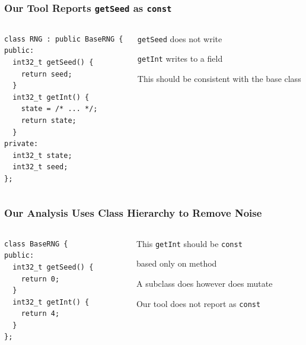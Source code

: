 \documentclass[aspectratio=169]{beamer}
\begin{document}
  \begin{frame}[fragile]
    \frametitle{Our Tool Reports \texttt{getSeed} as \texttt{const}}

    \begin{columns}
      \begin{column}{0.4\textwidth}
        \begin{lstlisting}
class RNG : public BaseRNG {
public:
  int32_t getSeed() {
    return seed;
  }
  int32_t getInt() {
    state = /* ... */;
    return state;
  }
private:
  int32_t state;
  int32_t seed;
};
        \end{lstlisting}
      \end{column}
      \begin{column}{0.5\textwidth}
        \texttt{getSeed} does not write 

        \vspace{1em}

        \texttt{getInt} writes to a field

        \vspace{4em}

        This should be consistent with the base class
      \end{column}
    \end{columns}
  \end{frame}

  \begin{frame}[fragile]
    \frametitle{Our Analysis Uses Class Hierarchy to Remove Noise}
    \begin{columns}
      \begin{column}{0.4\textwidth}
        \begin{lstlisting}
class BaseRNG {
public:
  int32_t getSeed() {
    return 0;
  }
  int32_t getInt() {
    return 4;
  }
};
        \end{lstlisting}
      \end{column}
      \begin{column}{0.5\textwidth}
        This \texttt{getInt} should be \texttt{const}

        \hspace{1em} based only on method

        \vspace{2em}

        A subclass does however does mutate

        \hspace{1em} Our tool does not report as \texttt{const}
      \end{column}
    \end{columns}
  \end{frame}
\end{document}
